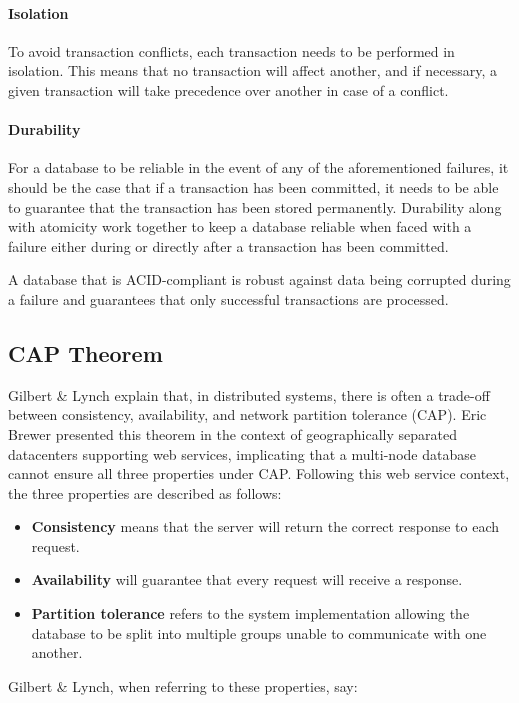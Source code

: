 \paragraph{Isolation}
To avoid transaction conflicts, each transaction needs to be performed in isolation. This means that no transaction will affect another, and if necessary, a given transaction will take precedence over another in case of a conflict.

\paragraph{Durability}
For a database to be reliable in the event of any of the aforementioned failures, it should be the case that if a transaction has been committed, it needs to be able to guarantee that the transaction has been stored permanently. Durability along with atomicity work together to keep a database reliable when faced with a failure either during or directly after a transaction has been committed.

A database that is ACID-compliant is robust against data being corrupted during a failure and guarantees that only successful transactions are processed.

\subsection{CAP Theorem}
\label{cap}
Gilbert \& Lynch \cite{cap} explain that, in distributed systems, there is often a trade-off between consistency, availability, and network partition tolerance (CAP). Eric Brewer presented this theorem in the context of geographically separated datacenters supporting web services, implicating that a multi-node database cannot ensure all three properties under CAP. Following this web service context, the three properties are described as follows:

\begin{itemize}
    \item \textbf{Consistency} means that the server will return the correct response to each request.
    \item \textbf{Availability} will guarantee that every request will receive a response.
    \item \textbf{Partition tolerance} refers to the system implementation allowing the database to be split into multiple groups unable to communicate with one another.
\end{itemize}

Gilbert \& Lynch, when referring to these properties, say:

